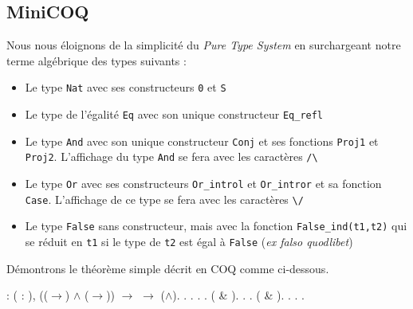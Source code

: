 \documentclass[11pt]{book}
\begin{document}
\subsection{MiniCOQ}
Nous  nous éloignons de la simplicité du \textit{Pure Type System} en surchargeant notre
 terme algébrique des types suivants :
\begin{itemize}
  \item Le type \verb+Nat+ avec ses constructeurs \verb+0+ et \verb+S+
  \item Le type de l'égalité \verb+Eq+ avec son unique constructeur \verb+Eq_refl+
  \item Le type \verb+And+ avec son unique constructeur \verb+Conj+ et ses fonctions
  \verb+Proj1+ et \verb+Proj2+. L'affichage du type \verb+And+ se fera avec les caractères \verb+/\+
  \item Le type \verb+Or+ avec ses constructeurs \verb+Or_introl+ et \verb+Or_intror+ et sa fonction \verb+Case+.
  L'affichage de ce type se fera avec les caractères \verb+\/+
  \item Le type \verb+False+ sans constructeur, mais avec la fonction \verb+False_ind(t1,t2)+ qui se
  réduit en \verb+t1+ si le type de \verb+t2+ est égal à \verb+False+  (\textit{ex falso quodlibet})
\end{itemize}

\vspace{0.2cm}
Démontrons le théorème simple décrit en COQ comme ci-dessous.


\begin{coqdoccode}
\coqdocnoindent
{}   : \coqdockw{\ensuremath{\forall}} (   : ), ((\ensuremath{\rightarrow}) \ensuremath{\land} (\ensuremath{\rightarrow})) \ensuremath{\rightarrow} \ensuremath{\rightarrow} (\ensuremath{\land}).\coqdoceol
\coqdocnoindent
{}.\coqdoceol
\coqdocindent{1.00em}
    .\coqdoceol
\coqdocindent{1.00em}
 .\coqdoceol
\coqdocindent{1.00em}
.\coqdoceol
\coqdocindent{1.00em}
   ( \& ).\coqdoceol
\coqdocindent{1.00em}
 . .\coqdoceol
\coqdocindent{1.00em}
   ( \& ).\coqdoceol
\coqdocindent{1.00em}
 . .\coqdoceol
\coqdocnoindent
{}.\coqdoceol
\coqdocemptyline
\end{coqdoccode}
\end{document}

